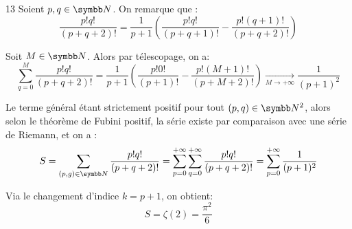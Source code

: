 \begin{correction}{13}
Soient $p,q \in \N$. On remarque que :
    \[ \frac{p! q!}{(p+q+2)!} = \frac{1}{p+1} \left(\frac{p! q!}{(p+q+1)!} - \frac{p! (q+1)!}{(p+q+2)!} \right) \]
    
    Soit $M \in \N$. Alors par télescopage, on a:
    \[ \sum_{q=0}^{M} \frac{p! q!}{(p+q+2)!} = \frac{1}{p+1} \left( \frac{p! 0!}{(p+1)!} - \frac{p! (M+1)!}{(p+M+2)!} \right) \xrightarrow[M \to +\infty]{} \frac{1}{(p+1)^2} \]
    
    Le terme général étant strictement positif pour tout $(p,q) \in \N^2$, alors selon le théorème de Fubini positif, 
    la série existe par comparaison avec une série de Riemann, et on a :
    \[S = \sum_{(p,g) \in \N}^{} \frac{p!q!}{(p+q+2)!} = \sum_{p=0}^{+\infty} \sum_{q=0}^{+\infty} \frac{p!q!}{(p+q+2)!} = \sum_{p=0}^{+\infty} \frac{1}{(p+1)^2} \]
    
    Via le changement d'indice $k = p+1$, on obtient: \[S = \zeta(2) = \frac{\pi^2}{6}\]
\end{correction}

